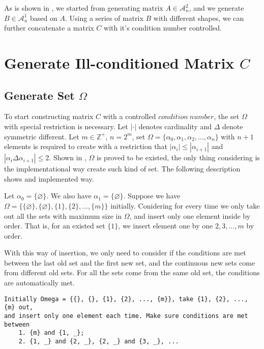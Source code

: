 \documentclass[11pt]{article}
\begin{document}
As is shown in \cite{ALON1997133}, we started from generating matrix $A \in \mathcal{A}_n^2$, and we generate $B \in \mathcal{A}_n^1$ based on $A$. Using a series of matrix $B$ with different shapes, we can further concatenate a matrix $C$ with it's condition number controlled.



\section{Generate Ill-conditioned Matrix $C$}


\subsection{Generate Set $\Omega$}
To start constructing matrix $C$ with a controlled $condition\ number$, the set $\Omega$ with special restriction is necessary. Let $|\cdot|$ denotes cardinality and $\Delta$ denote symmetric different. Let $m\in \mathbb{Z}^{+}$, $n=2^m$, set $\Omega = \{\alpha_0, \alpha_1, \alpha_2, ..., \alpha_n\}$ with $n + 1$ elements is required to create with a restriction that $|\alpha_i| \leq |\alpha_{i+1}|$ and $|\alpha_i \Delta \alpha_{i+1}| \leq 2$. Shown in \cite{doi:10.1137/S0895480192235878}, $\Omega$ is proved to be existed, the only thing considering is the implementational way create such kind of set. The following description shows and implemented way.

Let $\alpha_0=\{\varnothing\}$. We also have $\alpha_1=\{\varnothing\}$. Suppose we have $\Omega = \{\{\varnothing\}, \{\varnothing\}, \{1\}, \{2\}, ..., \{m\}\}$ initially. Conidering for every time we only take out all the sets with maximum size in $\Omega$, and insert only one element inside by order. That is, for an existed set $\{1\}$, we insert element one by one $2, 3, ..., m$ by order.

With this way of insertion, we only need to consider if the conditions are met between the last old set and the first new set, and the continuous new sets come from different old sets. For all the sets come from the same old set, the conditions are automatically met.
\begin{lstlisting}
Initially Omega = {{}, {}, {1}, {2}, ..., {m}}, take {1}, {2}, ..., {m} out, 
and insert only one element each time. Make sure conditions are met between
    1. {m} and {1, _}; 
    2. {1, _} and {2, _}, {2, _} and {3, _}, ...
\end{lstlisting}
\end{document}
